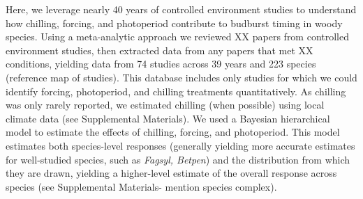 \documentclass{article}
\begin{document}
\par Here, we leverage nearly 40 years of controlled environment studies to understand how chilling, forcing, and photoperiod contribute to budburst timing in woody species. Using a meta-analytic approach we reviewed XX papers from controlled environment studies, then extracted data from any papers that met XX conditions, yielding data from 74 studies across 39 years and 223 species (reference map of studies).  This database includes only studies for which we could identify forcing, photoperiod, and chilling treatments quantitatively. As chilling was only rarely reported, we estimated chilling (when possible) using local climate data (see Supplemental Materials). We used a Bayesian hierarchical model to estimate the effects of chilling, forcing, and photoperiod. This model estimates both species-level responses (generally yielding more accurate estimates for well-studied species, such as \emph{Fagsyl, Betpen}) and the distribution from which they are drawn, yielding a higher-level estimate of the overall response across species (see Supplemental Materials- mention species complex).\\ %

\end{document}
